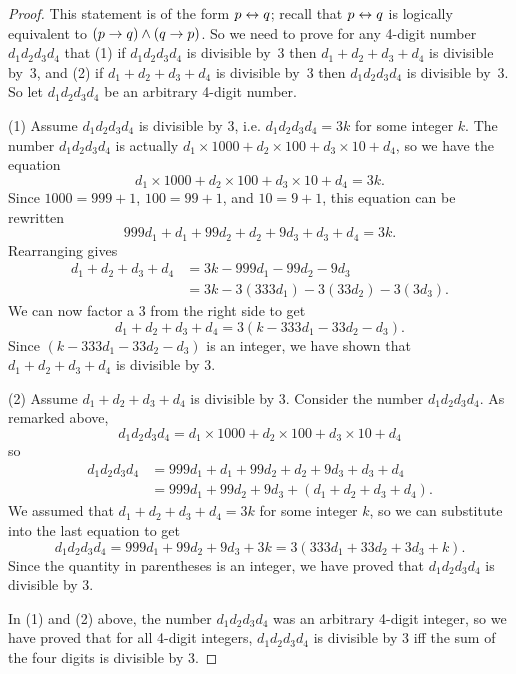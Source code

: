 \begin{proof}
This statement is of the form $p \leftrightarrow q$; recall that $p \leftrightarrow q$
is logically equivalent to $(p\rightarrow q) \wedge
(q \rightarrow p)$.  So we need to prove for any 4-digit number $d_1d_2d_3d_4$ that (1) if
$d_1d_2d_3d_4$ is divisible by~3 then $d_1+d_2+d_3+d_4$ is divisible by~3, and (2)
if $d_1+d_2+d_3+d_4$ is divisible by~3 then $d_1d_2d_3d_4$ is divisible by~3.
So let $d_1d_2d_3d_4$ be an arbitrary 4-digit number.

(1) Assume $d_1d_2d_3d_4$ is divisible by 3, i.e. $d_1d_2d_3d_4=3k$ for some integer
$k$.  The number $d_1d_2d_3d_4$ is actually $d_1 \times 1000 + d_2 \times 100 +
d_3 \times 10 + d_4$, so we have the equation 
$$d_1 \times 1000 + d_2 \times 100 +
d_3 \times 10 + d_4 = 3k.$$  
Since $1000=999+1$, $100=99+1$, and $10=9+1$, this
equation can be rewritten 
$$999d_1 + d_1 + 99d_2 + d_2 +9d_3 + d_3 + d_4 = 3k.$$
Rearranging gives
\begin{align*}
d_1 + d_2 +d_3 +d_4 &= 3k - 999d_1 - 99d_2 - 9d_3 \\
                    &= 3k - 3(333d_1) - 3(33d_2) - 3(3d_3).
\end{align*}
We can now factor a 3
from the right side to get 
$$d_1 + d_2 +d_3 +d_4 = 3(k - 333d_1 - 33d_2 - d_3).$$
Since $(k - 333d_1 - 33d_2 - d_3)$ is an integer, we have shown that $d_1 + d_2 +d_3 +d_4$
is divisible by 3.

(2) Assume $d_1 + d_2 +d_3 +d_4$
is divisible by 3. Consider the number $d_1d_2d_3d_4$.  As remarked above,
$$d_1d_2d_3d_4 = d_1 \times 1000 + d_2 \times 100 +
d_3 \times 10 + d_4$$ 
so 
\begin{align*}d_1d_2d_3d_4 &= 999d_1 + d_1 + 99d_2 + d_2 + 9d_3 + d_3 + d_4\\
                             &= 999d_1 + 99d_2 + 9d_3 + (d_1 + d_2 +d_3 +d_4).
\end{align*} 
We assumed that
$d_1 + d_2 +d_3 +d_4 = 3k$ for some integer $k$, so we can substitute into the
last equation to get 
$$d_1d_2d_3d_4 = 999d_1 + 99d_2 + 9d_3 + 3k = 3(333d_1 +
33d_2 + 3d_3 + k).$$  
Since the quantity in parentheses is an integer, we have
proved that $d_1d_2d_3d_4$ is divisible by 3.

In (1) and (2) above, the number $d_1d_2d_3d_4$ was an arbitrary 4-digit integer,
so we have proved that  for all 4-digit integers,
$d_1d_2d_3d_4$ is  divisible by 3 iff the sum of the four digits is divisible by 3.
\end{proof}


\medskip

